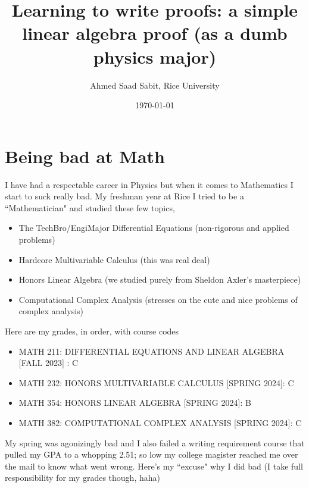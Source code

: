 \documentclass[letter]{article}
\title{Learning to write proofs: a simple linear algebra proof (as a dumb physics major)}
\author{Ahmed Saad Sabit, Rice University}
\date{\today}
\begin{document}
\maketitle

\section*{Being bad at Math} 
I have had a respectable career in Physics but when it comes to Mathematics I start to suck really bad. My freshman year at Rice I tried to be a ``Mathematician" and studied these few topics, 
\begin{itemize}
	\item The TechBro/EngiMajor Differential Equations (non-rigorous and applied problems)
	\item Hardcore Multivariable Calculus (this was real deal)
	\item Honors Linear Algebra (we studied purely from Sheldon Axler's masterpiece)
	\item Computational Complex Analysis (stresses on the cute and nice problems of complex analysis)
\end{itemize}
Here are my grades, in order, with course codes 
\begin{itemize}
	\item MATH 211: DIFFERENTIAL EQUATIONS AND LINEAR ALGEBRA [FALL 2023] : C
	\item MATH 232: HONORS MULTIVARIABLE CALCULUS [SPRING 2024]: C 
	\item MATH 354: HONORS LINEAR ALGEBRA [SPRING 2024]: B 
	\item MATH 382: COMPUTATIONAL COMPLEX ANALYSIS [SPRING 2024]: C
\end{itemize}
My spring was agonizingly bad and I also failed a writing requirement course that pulled my GPA to a whopping 2.51; so low my college magister reached me over the mail to know what went wrong. 
Here's my ``excuse" why I did bad (I take full responsibility for my grades though, haha)
\end{document}
